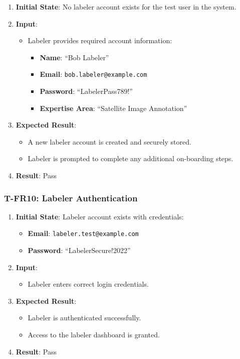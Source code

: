 \documentclass[12pt, titlepage]{article}
\begin{document}
\begin{enumerate}
    \item \textbf{Initial State}: No labeler account exists for the test user in the system.
    \item \textbf{Input}:
    \begin{itemize}
        \item Labeler provides required account information:
        \begin{itemize}
            \item \textbf{Name}: ``Bob Labeler''
            \item \textbf{Email}: \texttt{bob.labeler@example.com}
            \item \textbf{Password}: ``LabelerPass789!''
            \item \textbf{Expertise Area}: ``Satellite Image Annotation''
        \end{itemize}
    \end{itemize}
        \item \textbf{Expected Result}:
        \begin{itemize}
            \item A new labeler account is created and securely stored.
            \item Labeler is prompted to complete any additional on-boarding steps.
        \end{itemize}
        \item \textbf{Result}: Pass
\end{enumerate}

\subsubsection*{T-FR10: Labeler Authentication}

\begin{enumerate}
    \item \textbf{Initial State}: Labeler account exists with credentials:
    \begin{itemize}
        \item \textbf{Email}: \texttt{labeler.test@example.com}
        \item \textbf{Password}: ``LabelerSecure!2022''
    \end{itemize}
    \item \textbf{Input}:
    \begin{itemize}
        \item Labeler enters correct login credentials.
    \end{itemize}
        \item \textbf{Expected Result}:
        \begin{itemize}
            \item Labeler is authenticated successfully.
            \item Access to the labeler dashboard is granted.
        \end{itemize}
        \item \textbf{Result}: Pass
\end{enumerate}
\end{document}
